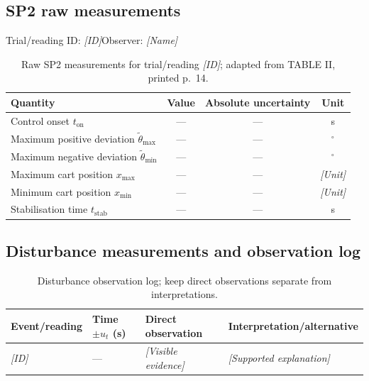 \documentclass[11pt,a4paper]{article}
\newif\ifdraft
\DeclareRobustCommand{\guide}[1]{\ifdraft\par\smallskip\small\itshape Draft guidance: #1\par\smallskip\fi}
\newcommand{\manual}[1]{\cite[printed pp.~#1]{labmanual}}
\newcommand{\placeholder}[1]{\textit{[#1]}}
\begin{document}
\subsection{SP2 raw measurements}
Trial/reading ID: \placeholder{ID}\quad Observer: \placeholder{Name}
\begin{table}[htbp]
\centering
\caption{Raw SP2 measurements for trial/reading \placeholder{ID}; adapted from TABLE II, printed p.~14.}
\label{tab:rawsp2}
\begin{tabularx}{\linewidth}{@{}lccc@{}}
\toprule
Quantity & Value & Absolute uncertainty & Unit \\
\midrule
Control onset $t_{\mathrm{on}}$ & --- & --- & s \\
Maximum positive deviation $\tilde\theta_{\max}$ & --- & --- & $^\circ$ \\
Maximum negative deviation $\tilde\theta_{\min}$ & --- & --- & $^\circ$ \\
Maximum cart position $x_{\max}$ & --- & --- & \placeholder{Unit} \\
Minimum cart position $x_{\min}$ & --- & --- & \placeholder{Unit} \\
Stabilisation time $t_{\mathrm{stab}}$ & --- & --- & s \\
\bottomrule
\end{tabularx}
\end{table}
\guide{Record first correction direction and remaining vibrations. Include the sampled angle/position observations used to compute the mean and ranges, with their timestamps and uncertainties. Sources: \manual{14--16, 22}.}

\subsection{Disturbance measurements and observation log}
\guide{For every event and repeated reading, record $t_d\pm u_{t_d}$, $\tilde\theta_{\max}\pm u_\theta$, $\Delta x_{\max}\pm u_x$, and $t_r\pm u_{t_r}$, with units, following TABLE III, printed p.~18. Also retain the observations used to determine pre-disturbance means, peaks, and recovery. Sources: \manual{18, 22}.}
\begin{table}[htbp]
\centering\small
\caption{Disturbance observation log; keep direct observations separate from interpretations.}
\label{tab:eventlog}
\begin{tabularx}{\linewidth}{@{}llXX@{}}
\toprule
Event/reading & Time $\pm u_t$ (s) & Direct observation & Interpretation/alternative \\
\midrule
\placeholder{ID} & --- & \placeholder{Visible evidence} & \placeholder{Supported explanation} \\
\bottomrule
\end{tabularx}
\end{table}
\guide{Include earliest evidence, primary disturbance type, first responding component, initial pendulum/cart directions, continued correction, exit from the $\pm20^\circ$ region, return to SP2, and final state. Source: \manual{18}.}
\end{document}
